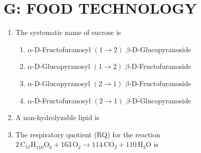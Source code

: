 \documentclass[a4paper,10pt]{article}
\begin{document}
\section*{G: FOOD TECHNOLOGY}
\begin{enumerate}
    \item The systematic name of sucrose is
    
    \hfill{}
    \begin{enumerate}
        \item $\alpha$-D-Fructofuranosyl $(1 \rightarrow 2)$ $\beta$-D-Glucopyranoside
        \item $\alpha$-D-Glucopyranosyl $(1 \rightarrow 2)$ $\beta$-D-Fructofuranoside
        \item $\alpha$-D-Glucopyranosyl $(2 \rightarrow 1)$ $\beta$-D-Fructofuranoside
        \item $\alpha$-D-Fructofuranosyl $(2 \rightarrow 1)$ $\beta$-D-Glucopyranoside
    \end{enumerate}
    
    \item A non-hydrolyzable lipid is
    
    \hfill{}
    \begin{enumerate}
    \end{enumerate}
    
    \item The respiratory quotient (RQ) for the reaction $2\,\text{C}_{57}\text{H}_{110}\text{O}_6 + 163\,\text{O}_2 \rightarrow 114\,\text{CO}_2 + 110\,\text{H}_2\text{O}$ is
    
    \hfill{}
    \begin{enumerate}
    \end{enumerate}
    

\end{enumerate}
\end{document}
